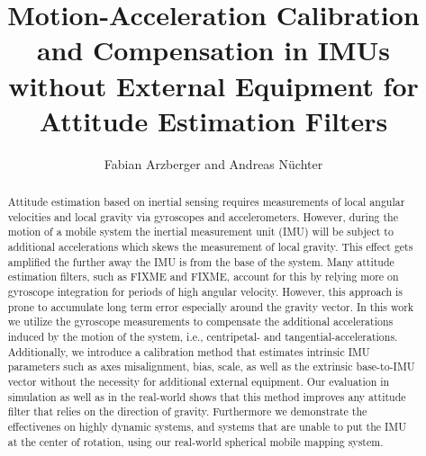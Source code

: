 \documentclass[journal]{IEEEtran}
\begin{document}
\title{Motion-Acceleration Calibration and Compensation in IMUs \\ without External Equipment for Attitude Estimation Filters}


\author{Fabian Arzberger and Andreas N{\"u}chter}



\maketitle

\begin{abstract}
  Attitude estimation based on inertial sensing requires measurements of local angular velocities and local gravity via gyroscopes and accelerometers.
  However, during the motion of a mobile system the inertial measurement unit (IMU) will be subject to additional accelerations which skews the measurement of local gravity.
  This effect gets amplified the further away the IMU is from the base of the system.
  Many attitude estimation filters, such as FIXME and FIXME, account for this by relying more on gyroscope integration for periods of high angular velocity.
  However, this approach is prone to accumulate long term error especially around the gravity vector.
  In this work we utilize the gyroscope measurements to compensate the additional accelerations induced by the motion of the system, i.e., centripetal- and tangential-accelerations.
  Additionally, we introduce a calibration method that estimates intrinsic IMU parameters such as axes misalignment, bias, scale, as well as the extrinsic base-to-IMU vector without the necessity for additional external equipment.
  Our evaluation in simulation as well as in the real-world shows that this method improves any attitude filter that relies on the direction of gravity.
  Furthermore we demonstrate the effectivenes on highly dynamic systems, and systems that are unable to put the IMU at the center of rotation, using our real-world spherical mobile mapping system.
\end{abstract}
\end{document}
